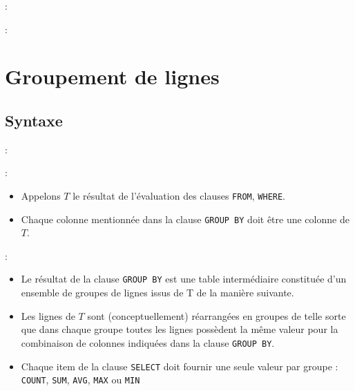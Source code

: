 \documentclass[10pt]{beamer}
\begin{document}
\begin{frame}{\secname : \subsecname}
    
\end{frame}

\begin{frame}{\secname : \subsecname}
    
\end{frame}

\section{Groupement de lignes}
\tocss
\subsection{Syntaxe}
\begin{frame}{\secname : \subsecname}
    
\end{frame}

\begin{frame}{\secname : \subsecname}
    \begin{itemize}
        \item Appelons $T$ le résultat de l'évaluation des clauses \lstinline[language=plsql]!FROM!, \lstinline[language=plsql]!WHERE!.
        \item Chaque colonne mentionnée dans la clause \lstinline[language=plsql]!GROUP BY! doit être une colonne de $T$.
    \end{itemize}
\end{frame}

\begin{frame}{\secname : \subsecname}
    \begin{itemize}
        \item Le résultat de la clause \lstinline[language=plsql]!GROUP BY! est une table intermédiaire constituée d'un ensemble de groupes de lignes issus de T de la manière suivante.
        \item Les lignes de $T$ sont (conceptuellement) réarrangées en groupes de telle sorte que dans chaque groupe toutes les lignes possèdent la même valeur pour la combinaison de colonnes indiquées dans la clause \lstinline[language=plsql]!GROUP BY!.
        \item Chaque item de la clause \lstinline[language=plsql]!SELECT! doit fournir une seule valeur par groupe : \lstinline[language=plsql]!COUNT!, \lstinline[language=plsql]!SUM!, \lstinline[language=plsql]!AVG!, \lstinline[language=plsql]!MAX! ou \lstinline[language=plsql]!MIN!
    \end{itemize}
\end{frame}
\end{document}

